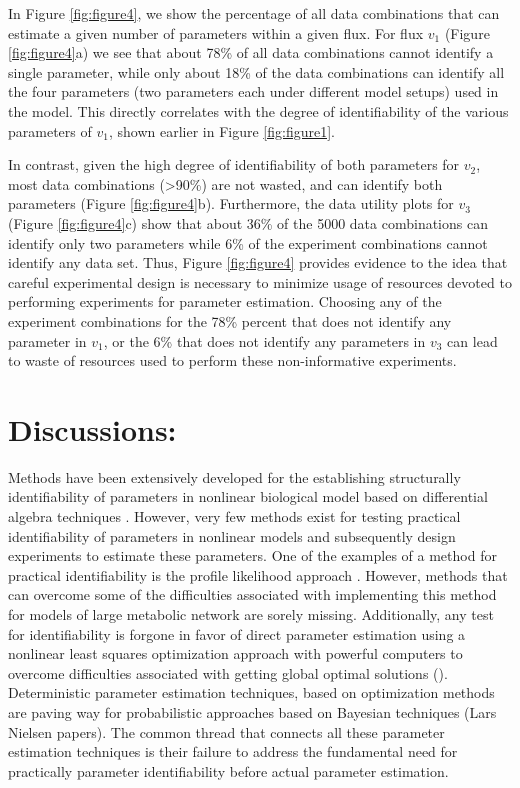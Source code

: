 \documentclass[10pt]{article}
\begin{document}
In Figure \ref{fig:figure4}, we show the percentage of all data combinations that can estimate a given number of parameters within a given flux. For flux $v_1$ (Figure \ref{fig:figure4}a) we see that about 78\% of all data combinations cannot identify a single parameter, while only about 18\% of the data combinations can identify all the four parameters (two parameters each under different model setups) used in the model. This directly correlates with the degree of identifiability of the various parameters of $v_1$, shown earlier in Figure \ref{fig:figure1}. 

In contrast, given the high degree of identifiability of both parameters for $v_2$, most data combinations (>90\%) are not wasted, and can identify both parameters (Figure \ref{fig:figure4}b). Furthermore, the data utility plots for $v_3$ (Figure \ref{fig:figure4}c) show that about 36\% of the 5000 data combinations can identify only two parameters while 6\% of the experiment combinations cannot identify any data set. Thus, Figure \ref{fig:figure4} provides evidence to the idea that careful experimental design is necessary to minimize usage of resources devoted to performing experiments for parameter estimation. Choosing any of the experiment combinations for the 78\% percent that does not identify any parameter in $v_1$, or the 6\% that does not identify any parameters in $v_3$ can lead to waste of resources used to perform these non-informative experiments.

\section{Discussions:}
Methods have been extensively developed for the establishing structurally identifiability of parameters in nonlinear biological model based on differential algebra techniques \parencite{Ljung1994}. However, very few methods exist for testing practical identifiability of parameters in nonlinear models and subsequently design experiments to estimate these parameters. One of the examples of a method for practical identifiability is the profile likelihood approach \parencite{Raue2009a}. However, methods that can overcome some of the difficulties associated with implementing this method for models of large metabolic network are sorely missing. Additionally, any test for identifiability is forgone in favor of direct parameter estimation using a nonlinear least squares optimization approach with powerful computers to overcome difficulties associated with getting global optimal solutions (). Deterministic parameter estimation techniques, based on optimization methods are paving way for probabilistic approaches based on Bayesian techniques (Lars Nielsen papers). The common thread that connects all these parameter estimation techniques is their failure to address the fundamental need for practically parameter identifiability before actual parameter estimation.
\end{document}
